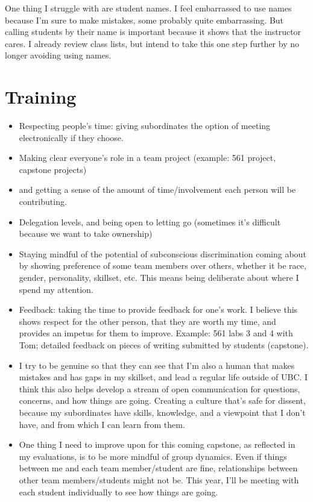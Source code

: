 \documentclass[]{book}
\providecommand{\tightlist}{%
  \setlength{\itemsep}{0pt}\setlength{\parskip}{0pt}}
\begin{document}
One thing I struggle with are student names. I feel embarrassed to use names because I'm sure to make mistakes, some probably quite embarrassing. But calling students by their name is important because it shows that the instructor cares. I already review class lists, but intend to take this one step further by no longer avoiding using names.

\hypertarget{training}{%
\section{Training}\label{training}}

\begin{itemize}
\tightlist
\item
  Respecting people's time: giving subordinates the option of meeting electronically if they choose.
\item
  Making clear everyone's role in a team project (example: 561 project, capstone projects)
\item
  and getting a sense of the amount of time/involvement each person will be contributing.
\item
  Delegation levels, and being open to letting go (sometimes it's difficult because we want to take ownership)
\item
  Staying mindful of the potential of subconscious discrimination coming about by showing preference of some team members over others, whether it be race, gender, personality, skillset, etc. This means being deliberate about where I spend my attention.
\item
  Feedback: taking the time to provide feedback for one's work. I believe this shows respect for the other person, that they are worth my time, and provides an impetus for them to improve. Example: 561 labs 3 and 4 with Tom; detailed feedback on pieces of writing submitted by students (capstone).
\item
  I try to be genuine so that they can see that I'm also a human that makes mistakes and has gaps in my skillset, and lead a regular life outside of UBC. I think this also helps develop a stream of open communication for questions, concerns, and how things are going. Creating a culture that's safe for dissent, because my subordinates have skills, knowledge, and a viewpoint that I don't have, and from which I can learn from them.
\item
  One thing I need to improve upon for this coming capstone, as reflected in my evaluations, is to be more mindful of group dynamics. Even if things between me and each team member/student are fine, relationships between other team members/students might not be. This year, I'll be meeting with each student individually to see how things are going.
\end{itemize}
\end{document}
